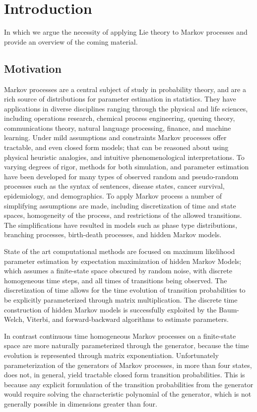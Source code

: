 \chapter{Introduction}
In which we argue the necessity of applying Lie theory to Markov processes and provide an
overview of the coming material.
\section{Motivation}
Markov processes are a central subject of study in probability theory, and are a rich source
of distributions for parameter estimation in statistics\cite{billingsley_probability_1995,rogers_diffusions_2000,rogers_diffusions_2000-1}.
They have applications in diverse disciplines ranging through the physical and life
sciences, including operations research, chemical process engineering, queuing theory,
communications theory, natural language processing, finance, and machine learning. Under
mild assumptions and constraints Markov processes offer tractable, and even closed form 
models; that can be reasoned about using physical heuristic analogies, and intuitive
phenomenological interpretations. To varying degrees of rigor, methods for both simulation,
and parameter estimation have been developed for many types of observed random and
pseudo-random processes such as the syntax of sentences, disease states, cancer survival,
epidemiology, and demographics. To apply Markov process a number of simplifying assumptions
are made, including discretization of time and state spaces, homogeneity of the process, and
restrictions of the allowed transitions. The simplifications have resulted in models such as
phase type distributions, branching processes, birth-death processes, and hidden Markov
models.

State of the art computational methods are focused on maximum likelihood parameter
estimation by expectation maximization of hidden Markov Models; which assumes a finite-state
space obscured by random noise, with discrete homogeneous time steps, and all times of
transitions being observed. The discretization of time allows for the time evolution of
transition probabilities to be explicitly parameterized through matrix multiplication. The
discrete time construction of hidden Markov models is successfully exploited by the
Baum-Welch, Viterbi, and forward-backward algorithms to estimate parameters.

In contrast continuous time homogeneous Markov processes on a finite-state space are more
naturally parameterized through the generator, because the time evolution is represented
through matrix exponentiation. Unfortunately parameterization of the generators of Markov
processes, in more than four states, does not, in general, yield tractable closed form
transition probabilities. This is because any explicit formulation of the transition
probabilities from the generator would require solving the characteristic polynomial of the
generator, which is not generally possible in dimensions greater than four. 

